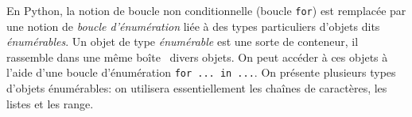 
    
En Python, la notion de boucle non conditionnelle (boucle \texttt{for}) est remplacée par une notion de \emph{boucle d'énumération} liée à des types particuliers d'objets dits \emph{énumérables}.\newline
Un objet de type \emph{énumérable} est une sorte de conteneur, il rassemble \og dans une même boîte\fg~ divers objets. On peut accéder à ces objets à l'aide d'une boucle d'énumération \texttt{for ... in ...}.\newline
On présente plusieurs types d'objets énumérables: on utilisera essentiellement les chaînes de caractères, les listes et les \og range\fg.

